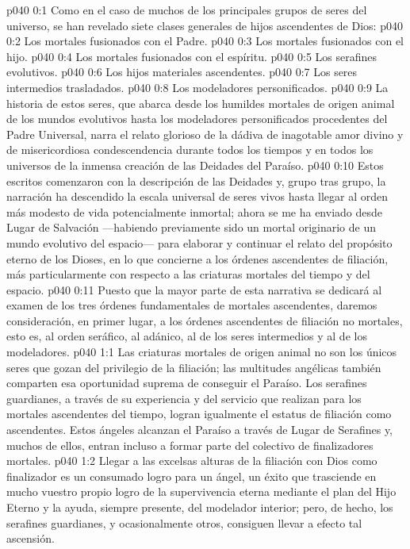 \author{Mensajero poderoso}
\vs p040 0:1 Como en el caso de muchos de los principales grupos de seres del universo, se han revelado siete clases generales de hijos ascendentes de Dios:
\vs p040 0:2 Los mortales fusionados con el Padre.
\vs p040 0:3 Los mortales fusionados con el hijo.
\vs p040 0:4 Los mortales fusionados con el espíritu.
\vs p040 0:5 Los serafines evolutivos.
\vs p040 0:6 Los hijos materiales ascendentes.
\vs p040 0:7 Los seres intermedios trasladados.
\vs p040 0:8 Los modeladores personificados.
\vs p040 0:9 \pc La historia de estos seres, que abarca desde los humildes mortales de origen animal de los mundos evolutivos hasta los modeladores personificados procedentes del Padre Universal, narra el relato glorioso de la dádiva de inagotable amor divino y de misericordiosa condescendencia durante todos los tiempos y en todos los universos de la inmensa creación de las Deidades del Paraíso.
\vs p040 0:10 Estos escritos comenzaron con la descripción de las Deidades y, grupo tras grupo, la narración ha descendido la escala universal de seres vivos hasta llegar al orden más modesto de vida potencialmente inmortal; ahora se me ha enviado desde Lugar de Salvación ---habiendo previamente sido un mortal originario de un mundo evolutivo del espacio--- para elaborar y continuar el relato del propósito eterno de los Dioses, en lo que concierne a los órdenes ascendentes de filiación, más particularmente con respecto a las criaturas mortales del tiempo y del espacio.
\vs p040 0:11 Puesto que la mayor parte de esta narrativa se dedicará al examen de los tres órdenes fundamentales de mortales ascendentes, daremos consideración, en primer lugar, a los órdenes ascendentes de filiación no mortales, esto es, al orden seráfico, al adánico, al de los seres intermedios y al de los modeladores.
\vs p040 1:1 Las criaturas mortales de origen animal no son los únicos seres que gozan del privilegio de la filiación; las multitudes angélicas también comparten esa oportunidad suprema de conseguir el Paraíso. Los serafines guardianes, a través de su experiencia y del servicio que realizan para los mortales ascendentes del tiempo, logran igualmente el estatus de filiación como ascendentes. Estos ángeles alcanzan el Paraíso a través de Lugar de Serafines y, muchos de ellos, entran incluso a formar parte del colectivo de finalizadores mortales.
\vs p040 1:2 Llegar a las excelsas alturas de la filiación con Dios como finalizador es un consumado logro para un ángel, un éxito que trasciende en mucho vuestro propio logro de la supervivencia eterna mediante el plan del Hijo Eterno y la ayuda, siempre presente, del modelador interior; pero, de hecho, los serafines guardianes, y ocasionalmente otros, consiguen llevar a efecto tal ascensión.
